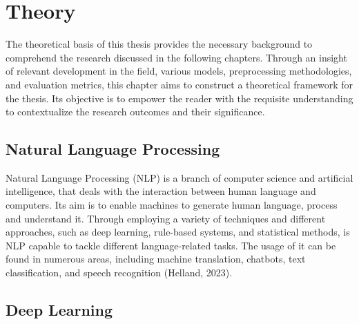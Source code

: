 \chapter{Theory}

The theoretical basis of this thesis provides the necessary background to comprehend the research discussed in the following chapters. Through an insight of relevant development in the field, various models, preprocessing methodologies, and evaluation metrics, this chapter aims to construct a theoretical framework for the thesis. Its objective is to empower the reader with the requisite understanding to contextualize the research outcomes and their significance.

\section{Natural Language Processing}

Natural Language Processing (NLP) is a branch of computer science and artificial intelligence, that deals with the interaction between human language and computers. Its aim is to enable machines to generate human language, process and understand it. Through employing a variety of techniques and different approaches, such as deep learning, rule-based systems, and statistical methods, is NLP capable to tackle different language-related tasks. The usage of it can be found in numerous areas, including machine translation, chatbots, text classification, and speech recognition (Helland, 2023).

\section{Deep Learning}

\Blindtext[4][1]
